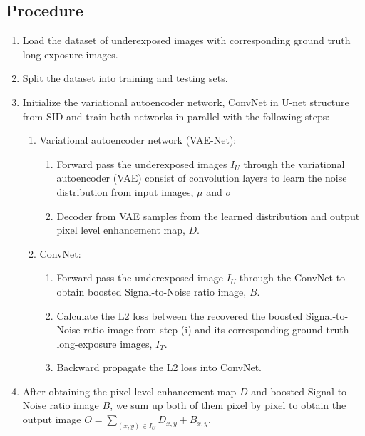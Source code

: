 \documentclass{article}
\begin{document}
\subsection{Procedure}
    \begin{enumerate}
    
    \item Load the dataset of underexposed images with corresponding ground truth long-exposure images.
    
    \item Split the dataset into training and testing sets.
    
    \item Initialize the variational autoencoder network, ConvNet in U-net structure from SID and train both networks in parallel with the following steps:
    \begin{enumerate}
        \item Variational autoencoder network (VAE-Net):
        \begin{enumerate}
            \item Forward pass the underexposed images $I_U$ through the variational autoencoder (VAE) consist of convolution layers to learn the noise distribution from input images, $\mu$ and $\sigma$
            \item Decoder from VAE samples from the learned distribution and output pixel level enhancement map, $D$.
        \end{enumerate}
        \item ConvNet:
        \begin{enumerate}
            \item Forward pass the underexposed image $I_U$ through the ConvNet to obtain boosted Signal-to-Noise ratio image, $B$.
            \item Calculate the L2 loss between the recovered the boosted Signal-to-Noise ratio image from step (i) and its corresponding ground truth long-exposure images, $I_T$.
            \item Backward propagate the L2 loss into ConvNet.
        \end{enumerate}
    \end{enumerate}
    
    \item After obtaining the pixel level enhancement map $D$ and boosted Signal-to-Noise ratio image $B$, we sum up both of them pixel by pixel to obtain the output image $O = \sum_{(x,y)\in I_U}D_{x,y} + B_{x,y}$.


\end{enumerate}
\end{document}
